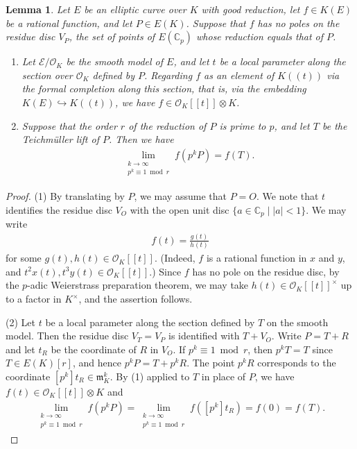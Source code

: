 \documentclass[11pt]{amsart}
\newtheorem{lem}[thm]{Lemma}
\theoremstyle{definition}
\newcommand{\C}{\mathbb{C}}
\begin{document}
\begin{lem}\label{pWPT}
Let $E$ be an elliptic curve over $K$ with good reduction, let
$f \in K(E)$ be a rational function, and let $P \in E(K)$.
Suppose that $f$ has no poles on the residue disc
$V_P$, the set of points of $E(\mathbb{C}_p)$ whose 
reduction equals that of $P$. 

\begin{enumerate}
\item Let $\mathcal{E}/\mathcal{O}_K$ be the smooth model of $E$, and let
$t$ be a local parameter along the section over $\mathcal{O}_K$ defined by
$P$. 
Regarding $f$ as an element of $K((t))$ via the formal completion along
this section, that is, via the embedding $K(E) \hookrightarrow K((t))$,
we have $f \in \mathcal{O}_K[[t]] \otimes K$.
\item Suppose that the order $r$ of the reduction of $P$ is prime to $p$,
and let $T$ be the Teichm\"{u}ller lift of $P$. Then we have
%
\begin{align*}
\lim_{\substack {k \to \infty \\ p^k \equiv 1 \bmod r}} f(p^kP)=f(T).
\end{align*}
%
\end{enumerate}
\end{lem}

\begin{proof}
\noindent\textup{(1)} By translating by $P$, we may assume that $P=O$.
We note that $t$ identifies the residue disc $V_O$ with the open unit disc $\{ a \in \C_p \mid |a|<1\}$. 
We may write
%
\begin{align*}
f(t)=\frac{g(t)}{h(t)}
\end{align*}
%
for some $g(t), h(t) \in \mathcal{O}_K[[t]]$.
(Indeed, $f$ is a rational function in $x$ and $y$, and $t^2x(t), t^3y(t) \in  \mathcal{O}_K[[t]]$.)
Since $f$ has no pole on the residue disc, by the $p$-adic Weierstrass preparation theorem, 
we may take 
$h(t)\in \mathcal{O}_K[[t]]^{\times}$ up to a factor in $K^{\times}$, and the assertion follows. 

\medskip
\noindent\textup{(2)} Let $t$ be a local parameter along the section defined by $T$ on the smooth model.
Then the residue disc $V_T=V_P$ is identified with $T+V_O$.
Write $P=T+R$ and let $t_R$ be the coordinate of $R$ in $V_O$.
If $p^k \equiv 1 \bmod r$, then $p^kT=T$ since $T \in E(K)[r]$, and hence $p^kP=T+p^kR$. 
The point $p^kR$ corresponds to the coordinate 
$[p^k]t_R \in \mathfrak{m}_K^k$. 
By (1) applied to $T$ in place of $P$, we have  $f(t) \in \mathcal{O}_K[[t]] \otimes K$ and  
%
\begin{align*}
\lim_{\substack {k \to \infty \\ p^k \equiv 1 \bmod r}} f(p^kP)
=\lim_{\substack {k \to \infty \\ p^k \equiv 1 \bmod r}} f([p^k]t_R)
=f(0)=f(T).
\end{align*}
%
\end{proof}
\end{document}
